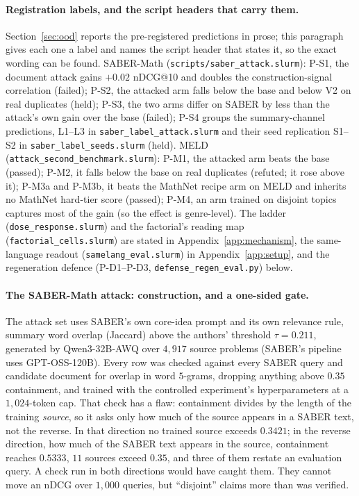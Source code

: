 \paragraph{Registration labels, and the script headers that carry them.}
Section~\ref{sec:ood} reports the pre-registered predictions in prose; this paragraph gives each one a label and names the script header that states it, so the exact wording can be found. SABER-Math (\texttt{scripts/saber\_attack.slurm}): P-S1, the document attack gains $+0.02$ nDCG@10 and doubles the construction-signal correlation (failed); P-S2, the attacked arm falls below the base and below V2 on real duplicates (held); P-S3, the two arms differ on SABER by less than the attack's own gain over the base (failed); P-S4 groups the summary-channel predictions, L1--L3 in \texttt{saber\_label\_attack.slurm} and their seed replication S1--S2 in \texttt{saber\_label\_seeds.slurm} (held). MELD (\texttt{attack\_second\_benchmark.slurm}): P-M1, the attacked arm beats the base (passed); P-M2, it falls below the base on real duplicates (refuted; it rose above it); P-M3a and P-M3b, it beats the MathNet recipe arm on MELD and inherits no MathNet hard-tier score (passed); P-M4, an arm trained on disjoint topics captures most of the gain (so the effect is genre-level). The ladder (\texttt{dose\_response.slurm}) and the factorial's reading map (\texttt{factorial\_cells.slurm}) are stated in Appendix~\ref{app:mechanism}, the same-language readout (\texttt{samelang\_eval.slurm}) in Appendix~\ref{app:setup}, and the regeneration defence (P-D1--P-D3, \texttt{defense\_regen\_eval.py}) below.

\paragraph{The SABER-Math attack: construction, and a one-sided gate.}
The attack set uses SABER's own core-idea prompt and its own relevance rule, summary word overlap (Jaccard) above the authors' threshold $\tau = 0.211$, generated by Qwen3-32B-AWQ over $4{,}917$ source problems (SABER's pipeline uses GPT-OSS-120B). Every row was checked against every SABER query and candidate document for overlap in word $5$-grams, dropping anything above $0.35$ containment, and trained with the controlled experiment's hyperparameters at a $1{,}024$-token cap. That check has a flaw: containment divides by the length of the training \emph{source}, so it asks only how much of the source appears in a SABER text, not the reverse. In that direction no trained source exceeds $0.3421$; in the reverse direction, how much of the SABER text appears in the source, containment reaches $0.5333$, $11$ sources exceed $0.35$, and three of them restate an evaluation query. A check run in both directions would have caught them. They cannot move an nDCG over $1{,}000$ queries, but ``disjoint'' claims more than was verified.

